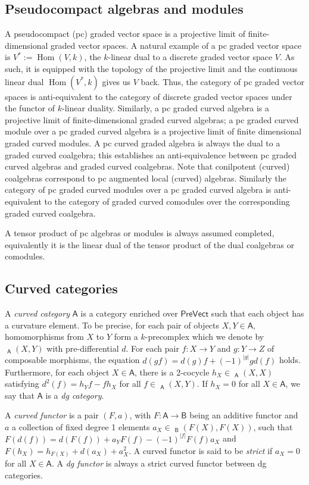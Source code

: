 \documentclass[a4paper]{amsart}
\theoremstyle{plain}
\theoremstyle{definition}
\theoremstyle{remark}
\DeclareMathOperator{\Hom}{Hom}
\DeclareMathOperator{\Homdg}{\underline{Hom}}
\newcommand{\cat}[1]{\mathsf{#1}}
\newcommand{\PreVect}{\cat{PreVect}}
\numberwithin{equation}{section}
\theoremstyle{plain}
\begin{document}
	\subsection{Pseudocompact algebras and modules} 
	A pseudocompact (pc) graded vector space is a projective limit of finite-dimensional graded vector spaces. A natural example of a pc graded vector space is $V^*:=\Hom(V,k)$, the $k$-linear dual to a discrete graded vector space $V$. As such, it is equipped with the topology of the projective limit and the continuous linear dual $\Hom(V^*,k)$ gives us $V$ back. Thus, the category of pc graded vector spaces is anti-equivalent to the category of discrete graded vector spaces under the functor of $k$-linear duality. Similarly, a pc graded curved algebra is a projective limit of finite-dimensional graded curved algebras; a pc graded curved module over a pc graded curved algebra is a projective limit of finite dimensional graded curved modules. A pc curved graded algebra is always the dual to a graded curved coalgebra; this establishes an anti-equivalence between pc graded curved algebras and graded curved coalgebras. Note that conilpotent (curved) coalgebras correspond to pc augmented local (curved) algebras.  Similarly the category of pc graded curved modules over a pc graded curved algebra is anti-equivalent to the category of graded curved comodules over the corresponding graded curved coalgebra.
	

	A tensor product of pc algebras or modules is always assumed completed,  equivalently it is the linear dual of the tensor product of the dual coalgebras or comodules.
	
	
	\subsection{Curved categories} 
	A \emph{curved category} $\cat{A}$ is a category enriched over $\PreVect$  such that each object has a curvature element.
	To be precise, for each pair of objects $X,Y \in \cat{A}$, homomorphisms from $X$ to $Y$ form a $k$-precomplex which we denote by $\Homdg_\cat{A}(X,Y)$ with pre-differential $d$. For each pair $f:X\to Y$ and $g:Y\to Z$ of composable morphisms, the equation $d(gf) = d(g) f+(-1)^{|g|}g d(f)$ holds.
	Furthermore, for each object $X\in \cat{A}$, there is a 2-cocycle $h_X\in \Homdg_\cat{A}(X,X)$ satisfying $d^2(f)=h_Yf-fh_X$ for all $f\in \Homdg_\cat{A}(X,Y)$. If $h_X=0$ for all $X \in \cat{A}$, we say that $\cat{A}$ is a \emph{dg category}.
	
	A \emph{curved functor} is a pair $(F,a)$, with $F:\cat{A}\to \cat{B}$ being an additive functor and $a$ a collection of fixed degree 1 elements $a_X\in 
	\Homdg_\cat{B}(F(X),F(X))$, such that $F(d(f))=d(F(f))+a_YF(f)-(-1)^{|f|}F(f)a_X$ and $F(h_X)=h_{F(X)}+d(a_X)+a^2_X$.
	A curved functor is said to be \emph{strict} if $a_X=0$ for all $X\in \cat{A}$. A \emph{dg functor} is always a strict curved functor between dg categories.
	
\end{document}
